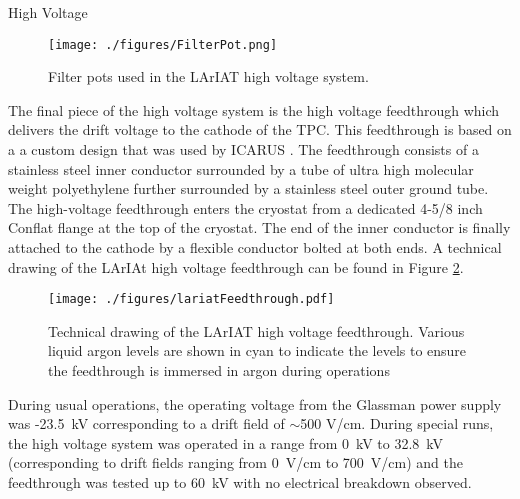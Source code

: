 \begin{subsubsection}{High Voltage}
\begin{figure}[htb]
\centering
\texttt{[image: ./figures/FilterPot.png]}\\
\caption{Filter pots used in the LArIAT high voltage system.}
\label{fig:FilterPot}
\end{figure}%

The final piece of the high voltage system is the high voltage feedthrough which delivers the drift voltage to the cathode of the TPC. This feedthrough is based on a a custom design that was used by ICARUS \cite{IcarusDetector}. The feedthrough consists of a stainless steel inner conductor surrounded by a tube of ultra high molecular weight polyethylene further surrounded by a stainless steel outer ground tube. The high-voltage feedthrough enters the cryostat from a dedicated 4-5/8 inch Conflat flange at the top of the cryostat. The end of the inner conductor is finally attached to the cathode by a flexible conductor bolted at both ends. A technical drawing of the LArIAt high voltage feedthrough can be found in Figure \ref{fig:HVFT}. 

\begin{figure}[htb]
\centering
\texttt{[image: ./figures/lariatFeedthrough.pdf]}\\
\caption{Technical drawing of the LArIAT high voltage feedthrough. Various liquid argon levels are shown in cyan to indicate the levels to ensure the feedthrough is immersed in argon during operations}
\label{fig:HVFT}
\end{figure}%

During usual operations, the operating voltage from the Glassman power supply was -23.5~kV corresponding to a drift field of $\sim$500 V/cm. During special runs, the high voltage system was operated in a range from 0~kV to 32.8~kV (corresponding to drift fields ranging from 0~V/cm to 700~V/cm) and the feedthrough was tested up to 60~kV with no electrical breakdown observed.


\end{subsubsection}

